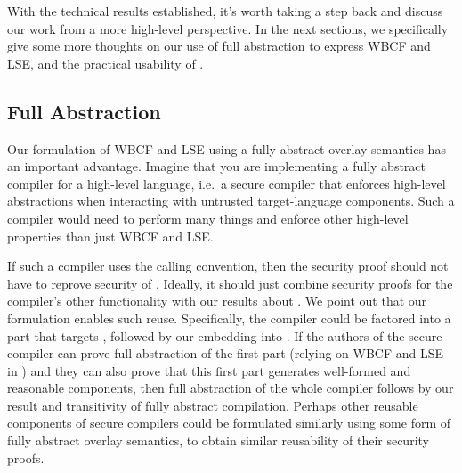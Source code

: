 With the technical results established, it's worth taking a step back and discuss our work from a more high-level perspective.
In the next sections, we specifically give some more thoughts on our use of full abstraction to express WBCF and LSE, and the practical usability of \stktokens{}.

\subsection{Full Abstraction}
Our formulation of WBCF and LSE using a fully abstract overlay semantics has an important advantage.
Imagine that you are implementing a fully abstract compiler for a high-level language, i.e.\ a secure compiler that enforces high-level abstractions when interacting with untrusted target-language components.
Such a compiler would need to perform many things and enforce other high-level properties than just WBCF and LSE.

If such a compiler uses the \stktokens{} calling convention, then the security proof should not have to reprove security of \stktokens{}.
Ideally, it should just combine security proofs for the compiler's other functionality with our results about \stktokens{}.
We point out that our formulation enables such reuse.
Specifically, the compiler could be factored into a part that targets \srccm{}, followed by our embedding into \trgcm{}.
If the authors of the secure compiler can prove full abstraction of the first part (relying on WBCF and LSE in \srccm{}) and they can also prove that this first part generates well-formed and reasonable components, then full abstraction of the whole compiler follows by our result and transitivity of fully abstract compilation.
Perhaps other reusable components of secure compilers could be formulated similarly using some form of fully abstract overlay semantics, to obtain similar reusability of their security proofs.

